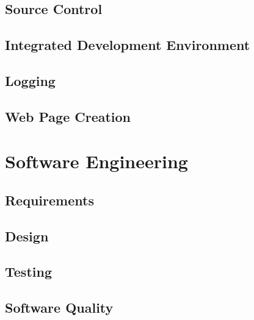 \subsection{Source Control}

\subsection{Integrated Development Environment}

\subsection{Logging}

\subsection{Web Page Creation}

\section{Software Engineering}

\subsection{Requirements}

\subsection{Design}

\subsection{Testing}

\subsection{Software Quality}	